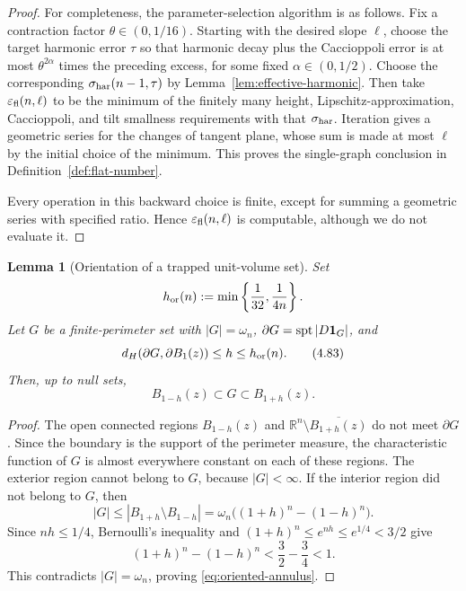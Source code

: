 \documentclass[11pt]{amsart}
\newtheorem{lemma}[theorem]{Lemma}
\theoremstyle{definition}
\newcommand{\R}{\mathbb R}
\begin{document}
\begin{proof}
For completeness, the parameter-selection algorithm is as follows.
Fix a contraction factor \(\theta\in(0,1/16)\).  Starting with the
desired slope \(\ell\), choose the target harmonic error \(\tau\) so
that harmonic decay plus the Caccioppoli error is at most
\(\theta^{2\alpha}\) times the preceding excess, for some fixed
\(\alpha\in(0,1/2)\).  Choose the corresponding
\(\sigma_{\rm har}(n-1,\tau)\) by Lemma~\ref{lem:effective-harmonic}.
Then take \(\varepsilon_{\rm fl}(n,\ell)\) to be the minimum of the
finitely many height, Lipschitz-approximation, Caccioppoli, and tilt
smallness requirements with that \(\sigma_{\rm har}\).  Iteration gives
a geometric series for the changes of tangent plane, whose sum is made
at most \(\ell\) by the initial choice of the minimum.  This proves the
single-graph conclusion in Definition~\ref{def:flat-number}.

Every operation in this backward choice is finite, except for summing a
geometric series with specified ratio.  Hence
\(\varepsilon_{\rm fl}(n,\ell)\) is computable, although we do not
evaluate it.
\end{proof}

\begin{lemma}[Orientation of a trapped unit-volume set]\label{lem:phase-orient}
Set
\[
   h_{\rm or}(n):=\min\left\{\frac1{32},\frac1{4n}\right\}.
\]
Let \(G\) be a finite-perimeter set with \(|G|=\omega_n\),
\(\partial G=\operatorname{spt}|D{\bf1}_G|\), and
\[
   d_H(\partial G,\partial B_1(z))\le h\le h_{\rm or}(n).
\tag{4.83}\label{eq:trapped-H}
\]
Then, up to null sets,
\[
   B_{1-h}(z)\subset G\subset B_{1+h}(z).
\tag{4.84}\label{eq:oriented-annulus}
\]
\end{lemma}

\begin{proof}
The open connected regions \(B_{1-h}(z)\) and
\(\R^n\setminus\overline{B_{1+h}(z)}\) do not meet \(\partial G\).
Since the boundary is the support of the perimeter measure, the
characteristic function of \(G\) is almost everywhere constant on each
of these regions.  The exterior region cannot belong to \(G\), because
\(|G|<\infty\).  If the interior region did not belong to \(G\), then
\[
   |G|\le |B_{1+h}\setminus B_{1-h}|
       =\omega_n\bigl((1+h)^n-(1-h)^n\bigr).
\]
Since \(nh\le1/4\), Bernoulli's inequality and
\((1+h)^n\le e^{nh}\le e^{1/4}<3/2\) give
\[
   (1+h)^n-(1-h)^n
      <\frac32-\frac34<1.
\tag{4.85}\label{eq:orientation-small}
\]
This contradicts \(|G|=\omega_n\), proving
\eqref{eq:oriented-annulus}.
\end{proof}
\end{document}
